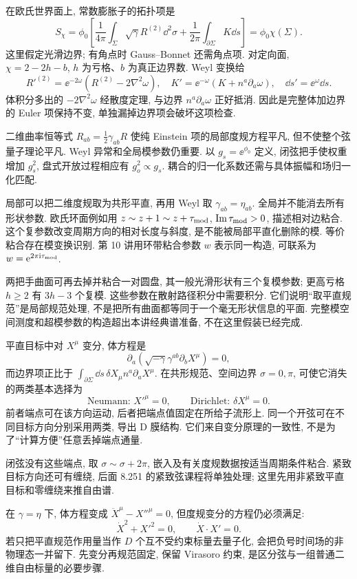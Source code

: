 在欧氏世界面上, 常数膨胀子的拓扑项是
\[
S_\chi=\phi_0\left[
\frac1{4\pi}\int_\Sigma\sqrt\gamma R^{(2)}\dd^2\sigma
+\frac1{2\pi}\int_{\partial\Sigma}K\dd s\right]
=\phi_0\chi(\Sigma).
\]
这里假定光滑边界; 有角点时 Gauss--Bonnet 还需角点项. 对定向面, $\chi=2-2h-b$, $h$ 为亏格、$b$ 为真正边界数. Weyl 变换给
\[
R'^{(2)}=\ee^{-2\omega}(R^{(2)}-2\nabla^2\omega),
\quad K'=\ee^{-\omega}(K+n^a\partial_a\omega),
\quad \dd s'=\ee^\omega\dd s.
\]
体积分多出的 $-2\nabla^2\omega$ 经散度定理, 与边界 $n^a\partial_a\omega$ 正好抵消. 因此是完整体加边界的 Euler 项保持不变, 单独漏掉边界项会破坏这项检查.

二维曲率恒等式 $R_{ab}=\tfrac12\gamma_{ab}R$ 使纯 Einstein 项的局部度规方程平凡, 但不使整个弦量子理论平凡. Weyl 异常和全局模参数仍重要. 以 $g_s=\ee^{\phi_0}$ 定义, 闭弦把手使权重增加 $g_s^2$, 盘式开放过程相应有 $g_o^2\propto g_s$. 耦合的归一化系数还需与具体振幅和场归一化匹配.

局部可以把二维度规取为共形平直, 再用 Weyl 取 $\gamma_{ab}=\eta_{ab}$. 全局并不能消去所有形状参数. 欧氏环面例如用 $z\sim z+1\sim z+\tau_{\rm mod}$, $\operatorname{Im}\tau_{\rm mod}>0$, 描述相对边粘合. 这个复参数改变周期方向的相对长度与斜度, 是不能被局部平直化删除的模. 等价粘合存在模变换识别. 第 10 讲用环带粘合参数 $w$ 表示同一构造, 可联系为 $w=\mathrm e^{2\pi\mathrm i\tau_{\rm mod}}$.

两把手曲面可再去掉并粘合一对圆盘, 其一般光滑形状有三个复模参数; 更高亏格 $h\ge2$ 有 $3h-3$ 个复模. 这些参数在散射路径积分中需要积分. 它们说明“取平直规范”是局部规范处理, 不是把所有曲面都等同于一个毫无形状信息的平面. 完整模空间测度和超模参数的构造超出本讲经典谱准备, 不在这里假装已经完成.

平直目标中对 $X^\mu$ 变分, 体方程是
\[
\partial_a(\sqrt{-\gamma}\gamma^{ab}\partial_bX^\mu)=0,
\]
而边界项正比于 $\int_{\partial\Sigma}\dd s\,
\delta X_\mu n^a\partial_aX^\mu$. 在共形规范、空间边界 $\sigma=0,\pi$, 可使它消失的两类基本选择为
\[
\text{Neumann: }X'^\mu=0,\qquad
\text{Dirichlet: }\delta X^\mu=0.
\]
前者端点可在该方向运动, 后者把端点值固定在所给子流形上. 同一个开弦可在不同目标方向分别采用两类, 导出 D 膜结构. 它们来自变分原理的一致性, 不是为了“计算方便”任意丢掉端点通量.

闭弦没有这些端点, 取 $\sigma\sim\sigma+2\pi$, 嵌入及有关度规数据按适当周期条件粘合. 紧致目标方向还可有缠绕, 后面 8.251 的紧致弦课程将单独处理; 这里先用非紧致平直目标和零缠绕来推自由谱.

在 $\gamma=\eta$ 下, 体方程变成 $\ddot X^\mu-X''^\mu=0$, 但度规变分的方程仍必须满足:
\[
\dot X^2+X'^2=0,\qquad \dot X\cdot X'=0.
\]
若只把平直规范作用量当作 $D$ 个互不受约束标量去量子化, 会把负号时间场的非物理态一并留下. 先变分再规范固定, 保留 Virasoro 约束, 是区分弦与一组普通二维自由标量的必要步骤.

